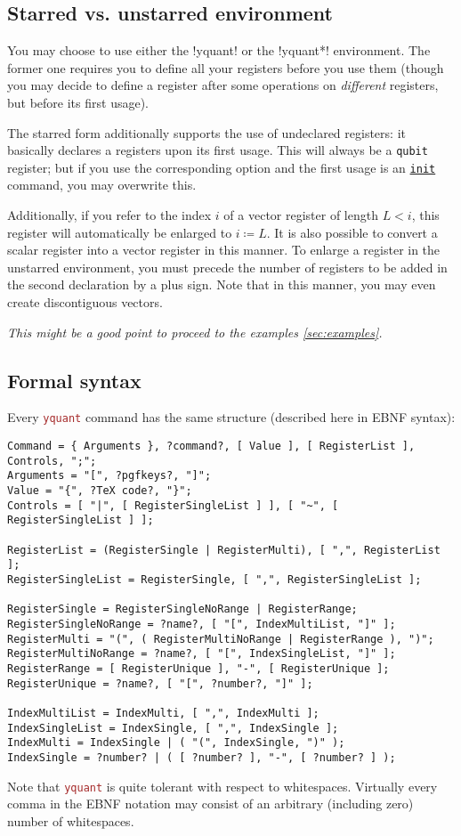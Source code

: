\documentclass{scrartcl}
\def\pkg#1{\textcolor{brown}{\texttt{#1}}}
\def\gate#1{\hyperref[gate:#1]{\texttt{#1}}}
\def\Yquant{\pkg{yquant}}
\begin{document}
      \subsection{Starred vs. unstarred environment}
         You may choose to use either the \tex!yquant! or the \tex!yquant*! environment.
         The former one requires you to define all your registers before you use them (though you may decide to define a register after some operations on \emph{different} registers, but before its first usage).
         
         The starred form additionally supports the use of undeclared registers: it basically declares a registers upon its first usage.
         This will always be a \texttt{qubit} register; but if you use the corresponding option and the first usage is an \gate{init} command, you may overwrite this.
         
         Additionally, if you refer to the index $i$ of a vector register of length $L < i$, this register will automatically be enlarged to $i \coloneq L$.
         It is also possible to convert a scalar register into a vector register in this manner.
         To enlarge a register in the unstarred environment, you must precede the number of registers to be added in the second declaration by a plus sign.
         Note that in this manner, you may even create discontiguous vectors.
         
         \emph{This might be a good point to proceed to the examples \cref{sec:examples}.}
      
      \subsection{Formal syntax}
         Every \Yquant{} command has the same structure (described here in EBNF syntax):
         \begin{verbatim}
Command = { Arguments }, ?command?, [ Value ], [ RegisterList ], Controls, ";";
Arguments = "[", ?pgfkeys?, "]";
Value = "{", ?TeX code?, "}";
Controls = [ "|", [ RegisterSingleList ] ], [ "~", [ RegisterSingleList ] ];

RegisterList = (RegisterSingle | RegisterMulti), [ ",", RegisterList ];
RegisterSingleList = RegisterSingle, [ ",", RegisterSingleList ];

RegisterSingle = RegisterSingleNoRange | RegisterRange;
RegisterSingleNoRange = ?name?, [ "[", IndexMultiList, "]" ];
RegisterMulti = "(", ( RegisterMultiNoRange | RegisterRange ), ")";
RegisterMultiNoRange = ?name?, [ "[", IndexSingleList, "]" ];
RegisterRange = [ RegisterUnique ], "-", [ RegisterUnique ];
RegisterUnique = ?name?, [ "[", ?number?, "]" ];

IndexMultiList = IndexMulti, [ ",", IndexMulti ];
IndexSingleList = IndexSingle, [ ",", IndexSingle ];
IndexMulti = IndexSingle | ( "(", IndexSingle, ")" );
IndexSingle = ?number? | ( [ ?number? ], "-", [ ?number? ] );
         \end{verbatim}
         Note that \Yquant{} is quite tolerant with respect to whitespaces.
         Virtually every comma in the EBNF notation may consist of an arbitrary (including zero) number of whitespaces.
         
\end{document}
